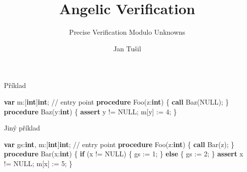 \documentclass[11pt]{beamer}
\author{Jan Tušil}
\title{Angelic Verification}
\subtitle{Precise Verification Modulo Unknowns}
\begin{document}
\begin{frame}
\titlepage
\end{frame}



\begin{frame}[fragile]{Příklad}
\begin{semiverbatim}
\textbf{var} m:[\textbf{int}]\textbf{int};
\pause
// entry point
\textbf{procedure} Foo(z:\textbf{int}) \{
  \textbf{call} Baz(NULL);
\}
\pause
\textbf{procedure} Baz(y:\textbf{int}) \{
  \textbf{assert} y != NULL; 
  m[y] := 4;
\}
\end{semiverbatim}
\end{frame}


\begin{frame}[fragile]{Jiný příklad}
\begin{semiverbatim}
\textbf{var} gs:\textbf{int}, m:[\textbf{int}]\textbf{int};
\pause{}
// entry point
\textbf{procedure} Foo(z:\textbf{int}) \{
  \textbf{call} Bar(z);
\}\pause
{}
\textbf{procedure} Bar(x:\textbf{int}) \{
  \textbf{if} (x != NULL) \{ gs := 1; \}
  \textbf{else} \{ gs := 2; \}
  \textbf{assert} x != NULL; 
  m[x] := 5;
\}
\end{semiverbatim}
\end{frame}
\end{document}
